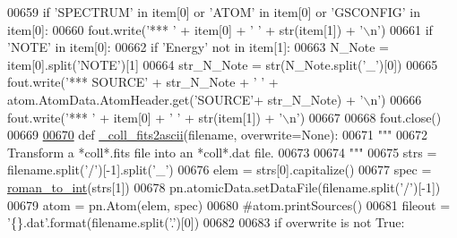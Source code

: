 \begin{DoxyCode}
00659         \textcolor{keywordflow}{if} \textcolor{stringliteral}{'SPECTRUM'} \textcolor{keywordflow}{in} item[0] \textcolor{keywordflow}{or} \textcolor{stringliteral}{'ATOM'} \textcolor{keywordflow}{in} item[0] \textcolor{keywordflow}{or} \textcolor{stringliteral}{'GSCONFIG'} \textcolor{keywordflow}{in} item[0]:
00660             fout.write(\textcolor{stringliteral}{'*** '} + item[0] + \textcolor{stringliteral}{' '} + str(item[1]) + \textcolor{stringliteral}{'\(\backslash\)n'})
00661         \textcolor{keywordflow}{if} \textcolor{stringliteral}{'NOTE'} \textcolor{keywordflow}{in} item[0]:
00662             \textcolor{keywordflow}{if} \textcolor{stringliteral}{'Energy'} \textcolor{keywordflow}{not} \textcolor{keywordflow}{in} item[1]:
00663                 N\_Note = item[0].split(\textcolor{stringliteral}{'NOTE'})[1]
00664                 str\_N\_Note = str(N\_Note.split(\textcolor{stringliteral}{'\_'})[0])
00665                 fout.write(\textcolor{stringliteral}{'*** SOURCE'} + str\_N\_Note + \textcolor{stringliteral}{' '} + atom.AtomData.AtomHeader.get(\textcolor{stringliteral}{'SOURCE'}+
      str\_N\_Note)  + \textcolor{stringliteral}{'\(\backslash\)n'})
00666                 fout.write(\textcolor{stringliteral}{'*** '} + item[0] + \textcolor{stringliteral}{' '} + str(item[1]) + \textcolor{stringliteral}{'\(\backslash\)n'})
00667     
00668     fout.close()
00669     
\hypertarget{manage__atomic__data_8py_source_l00670}{}\hyperlink{namespacepyneb_1_1utils_1_1manage__atomic__data_a1d70a5d8b876f114e058506cd9998de4}{00670} \textcolor{keyword}{def }\hyperlink{namespacepyneb_1_1utils_1_1manage__atomic__data_a1d70a5d8b876f114e058506cd9998de4}{\_coll\_fits2ascii}(filename, overwrite=None):
00671     \textcolor{stringliteral}{"""}
00672 \textcolor{stringliteral}{    Transform a *coll*.fits file into an *coll*.dat file.}
00673 \textcolor{stringliteral}{    }
00674 \textcolor{stringliteral}{    """}
00675     strs = filename.split(\textcolor{stringliteral}{'/'})[-1].split(\textcolor{stringliteral}{'\_'})
00676     elem = strs[0].capitalize()
00677     spec = \hyperlink{namespacepyneb_1_1utils_1_1misc_a97329c3ce57bd870421672b90e3e6541}{roman\_to\_int}(strs[1])
00678     pn.atomicData.setDataFile(filename.split(\textcolor{stringliteral}{'/'})[-1])
00679     atom = pn.Atom(elem, spec)
00680     \textcolor{comment}{#atom.printSources()}
00681     fileout = \textcolor{stringliteral}{'\{\}.dat'}.format(filename.split(\textcolor{stringliteral}{'.'})[0])
00682     
00683     \textcolor{keywordflow}{if} overwrite \textcolor{keywordflow}{is} \textcolor{keywordflow}{not} \textcolor{keyword}{True}:

\end{DoxyCode}
